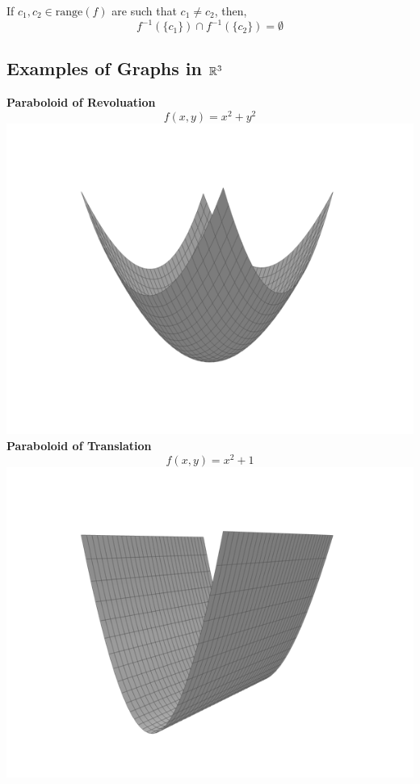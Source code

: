 \begin{rmk}
    If $c_1, c_2 \in \text{range}(f)$ are such that $c_1 \neq c_2$, then,
    \[f^{-1}(\{c_1\}) \cap f^{-1}(\{c_2\}) = \emptyset\]
\end{rmk}

\subsection{Examples of Graphs in $\mathbb{R}^3$}
\begin{marginfigure}
    \begin{center}
        \textbf{Paraboloid of Revoluation}
        \[f(x, y) = x^2 + y^2\]
        \includegraphics[width=\linewidth]{figures/wk-1/fig-5.png}
        \LineBreak
        \textbf{Paraboloid of Translation}
        \[f(x, y) = x^2 + 1\]
        \includegraphics[width=\linewidth]{figures/wk-1/fig-7.png}

\end{center}
\end{marginfigure}
